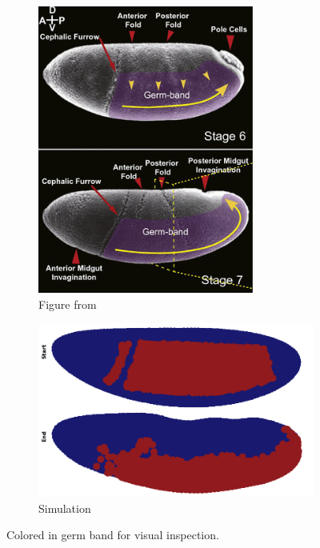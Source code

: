 \begin{figure}[H]
    \centering
    \begin{subfigure}[b]{0.34\textwidth}
        \includegraphics[width=\textwidth]{chapters/Results/figures/compareGB.png}
    \caption{Figure from \cite{kong2017forces} }
    \end{subfigure}
     \hfill
    \begin{subfigure}[b]{0.61\textwidth}
    \includegraphics[width=\textwidth]{chapters/Results/figures/gb_firstframe_lastframe.png}
    \caption{Simulation}
    \end{subfigure}
    \caption{Colored in germ band for visual inspection.}
    \label{fig:germbandCompare}
\end{figure}

